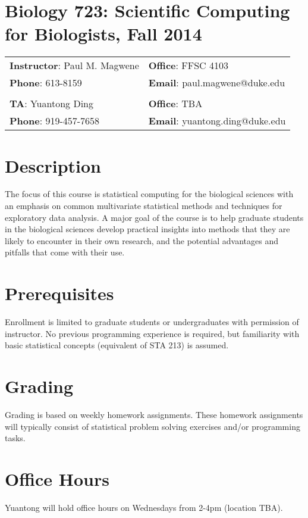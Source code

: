 \documentclass[11pt,letterpaper]{article}
\begin{document}
\section*{\centering Biology 723: Scientific Computing for Biologists, Fall 2014}
\begin{center}
\begin{tabular}{ll}
\textbf{Instructor}: Paul M. Magwene & \textbf{Office}: FFSC 4103\\
\textbf{Phone}: 613-8159 & \textbf{Email}: paul.magwene@duke.edu\\
&\\
\textbf{TA}: Yuantong Ding & \textbf{Office}: TBA\\
\textbf{Phone}: 919-457-7658 & \textbf{Email}: yuantong.ding@duke.edu\\
\end{tabular}
\end{center}

\section*{Description}

The focus of this course is statistical computing for the biological sciences with an emphasis on common multivariate statistical methods and techniques for exploratory data analysis. A major goal of the course is to help graduate students in the biological sciences develop practical insights into methods that they are likely to encounter in their own research, and the potential advantages and pitfalls that come with their use.

\section*{Prerequisites}

Enrollment is limited to graduate students or undergraduates with permission of instructor. No previous programming experience is required, but familiarity with basic statistical concepts (equivalent of STA 213) is assumed.

\section*{Grading}
Grading is based on weekly homework assignments. These homework assignments will typically consist of statistical problem solving exercises and/or programming tasks.

\section*{Office Hours}
Yuantong will hold office hours on Wednesdays from 2-4pm (location TBA).
\end{document}
